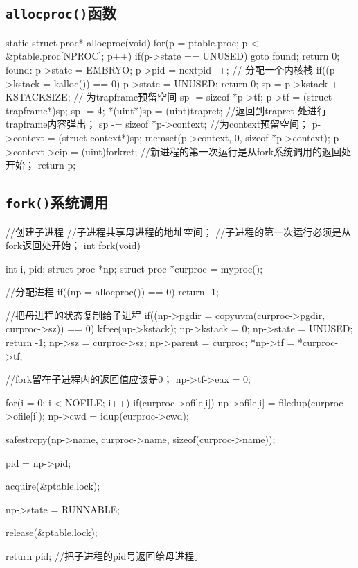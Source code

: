 \documentclass{swfcthesismscctex}
\begin{document}
\subsection{\texttt{allocproc()}函数}
\label{sec:allocproc}

\begin{ccode}
static struct proc* allocproc(void)
{  
  for(p = ptable.proc; p < &ptable.proc[NPROC]; p++)
    if(p->state == UNUSED)
      goto found;
  return 0;
found:
  p->state = EMBRYO;
  p->pid = nextpid++;
  // 分配一个内核栈
  if((p->kstack = kalloc()) == 0){
    p->state = UNUSED;
    return 0;
  }
  sp = p->kstack + KSTACKSIZE;
  // 为trapframe预留空间
  sp -= sizeof *p->tf;
  p->tf = (struct trapframe*)sp;
  sp -= 4;
  *(uint*)sp = (uint)trapret; //返回到trapret 处进行trapframe内容弹出；
  sp -= sizeof *p->context; //为context预留空间；
  p->context = (struct context*)sp;
  memset(p->context, 0, sizeof *p->context);
  p->context->eip = (uint)forkret; //新进程的第一次运行是从fork系统调用的返回处开始；
  return p;
}
\end{ccode}

\subsection{\texttt{fork()}系统调用}
\label{sec:fork}

\begin{ccode}
//创建子进程
//子进程共享母进程的地址空间；
//子进程的第一次运行必须是从fork返回处开始；
int fork(void){
  int i, pid;
  struct proc *np;
  struct proc *curproc = myproc();

  //分配进程
  if((np = allocproc()) == 0){
    return -1;
  }

  //把母进程的状态复制给子进程
  if((np->pgdir = copyuvm(curproc->pgdir, curproc->sz)) == 0){
    kfree(np->kstack);
    np->kstack = 0;
    np->state = UNUSED;
    return -1;
  }
  np->sz = curproc->sz;
  np->parent = curproc;
  *np->tf = *curproc->tf;

  //fork留在子进程内的返回值应该是0；
  np->tf->eax = 0;

  for(i = 0; i < NOFILE; i++)
    if(curproc->ofile[i])
      np->ofile[i] = filedup(curproc->ofile[i]);
  np->cwd = idup(curproc->cwd);

  safestrcpy(np->name, curproc->name, sizeof(curproc->name));

  pid = np->pid;

  acquire(&ptable.lock);

  np->state = RUNNABLE;

  release(&ptable.lock);

  return pid; //把子进程的pid号返回给母进程。
}
\end{ccode}
\end{document}
